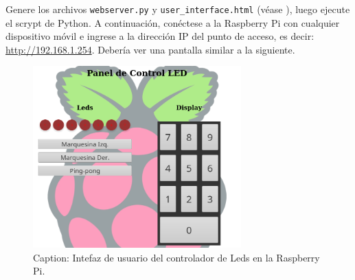 Genere los archivos \texttt{webserver.py} y \texttt{user\_interface.html} (véase ), luego ejecute el scrypt de Python.
A continuación, conéctese a la Raspberry Pi con cualquier dispositivo móvil e ingrese a la dirección IP del punto de acceso, es decir: \url{http://192.168.1.254}.
Debería ver una pantalla similar a la siguiente.

\begin{figure}[H]
	\centering
	\includegraphics[height=7cm,keepaspectratio]{img/screenshot-ui.png}
	\caption{Caption: Intefaz de usuario del controlador de Leds en la Raspberry Pi.}
	\label{fig:hello-world} %
\end{figure}


